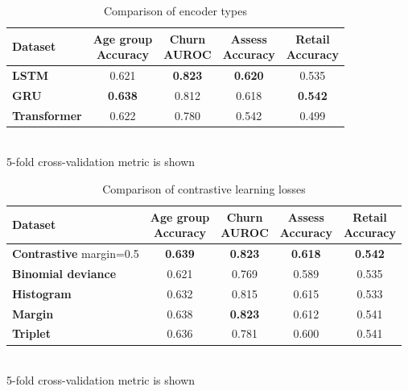 \documentclass[sigconf, anonymous]{acmart}
\begin{document}

\begin{table}
\centering
\caption{Comparison of encoder types}
\begin{tabular}{lcccc}

\toprule
\textbf{Dataset} &
\makecell{\textbf{Age group} \\ \small{Accuracy}} &
\makecell{\textbf{Churn} \\ \small{AUROC}} &
\makecell{\textbf{Assess} \\ \small{Accuracy}} &
\makecell{\textbf{Retail} \\ \small{Accuracy}} \\
\midrule

\textbf{LSTM} & 0.621 & \textbf{0.823} & \textbf{0.620} & 0.535 \\
\textbf{GRU} & \textbf{0.638} & 0.812 & 0.618 & \textbf{0.542} \\
\textbf{Transformer} & 0.622 & 0.780 & 0.542 & 0.499 \\

\bottomrule
\end{tabular} \\
\small{5-fold cross-validation metric is shown}
\label{tab-enc-type}
\end{table}

\begin{table}
\centering
\caption{Comparison of contrastive learning losses}
\begin{tabularx}{\linewidth}{Xcccc}
\toprule
\textbf{Dataset} &
\makecell{\textbf{Age group} \\ \small{Accuracy}} &
\makecell{\textbf{Churn} \\ \small{AUROC}} &
\makecell{\textbf{Assess} \\ \small{Accuracy}} &
\makecell{\textbf{Retail} \\ \small{Accuracy}} \\
\midrule

\textbf{Contrastive} \small{margin=0.5} & \textbf{0.639} & \textbf{0.823} & \textbf{0.618} & \textbf{0.542} \\
\textbf{Binomial deviance} & 0.621 & 0.769 & 0.589 & 0.535 \\
\textbf{Histogram} & 0.632 & 0.815 & 0.615 & 0.533 \\
\textbf{Margin} & 0.638 & \textbf{0.823} & 0.612 & 0.541 \\
\textbf{Triplet} & 0.636 & 0.781 & 0.600 & 0.541 \\

\bottomrule
\end{tabularx} \\
\small{5-fold cross-validation metric is shown}
\label{tab-loss-type}
\end{table}
\end{document}
